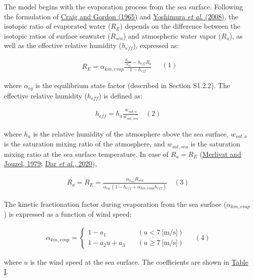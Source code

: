 \documentclass[11pt]{article}
\begin{document}
The model begins with the evaporation process from the sea surface. Following the formulation of
\hyperref[craig1965]{Craig and Gordon (1965)} and \hyperref[yoshimura2008]{Yoshimura \emph{et al.}
(2008)}, the isotopic ratio of evaporated water (\(R_{E}\)) depends on the difference between the
isotopic ratios of surface seawater (\(R_{sea}\)) and atmospheric water vapor (\(R_{a}\)), as well
as the effective relative humidity (\(h_{eff}\)), expressed as:

\[
\begin{array}{r}
R_{E} = \alpha_{kin,evap}\frac{\frac{R_{sea}}{\alpha_{eq}} - h_{eff}R_{a}}{1 - h_{eff}} 
\end{array} \quad (1)
\]

where \(\alpha_{eq}\) is the equilibrium state factor (described in Section S1.2.2). The effective
relative humidity (\(h_{eff}\)) is defined as:

\[
\begin{array}{r}
h_{eff} = h_{a}\frac{w_{sat,a}}{w_{sat,sea}} \quad (2)
\end{array}
\]

where \(h_{a}\) is the relative humidity of the atmosphere above the sea surface, \(w_{sat,a}\) is
the saturation mixing ratio of the atmosphere, and \(w_{sat,sea}\) is the saturation mixing ratio at
the sea surface temperature. In case of \(R_{a} = R_{E}\) (\hyperref[merlivat1979]{Merlivat and
Jouzel, 1979}; \hyperref[dar2020]{Dar \emph{et al.}, 2020}),

\[
\begin{array}{r}
R_{a} = R_{E} = \frac{\alpha_{k_{mv}}R_{sea}}{\alpha_{eq}\ (1 - h_{eff} + \alpha_{kin,evap}h_{eff})} \quad {(3)}
\end{array}
\]

The kinetic fractionation factor during evaporation from the sea surface (\(\alpha_{kin,evap}\)) is
expressed as a function of wind speed:

\[
\begin{array}{r}
\alpha_{kin,evap} = \left\{ \begin{matrix}
1 - a_{1}\quad & \left( u < 7\ \text{[m/s]} \right) \\
1 - a_{2}u + a_{3}\quad & \left( u \geq 7\ \text{[m/s]} \right)
\end{matrix} \right.\ \quad (4)
\end{array}
\]

where \(u\) is the wind speed at the sea surface. The coefficients are shown in
\hyperref[Table-I]{Table I}.
\end{document}
